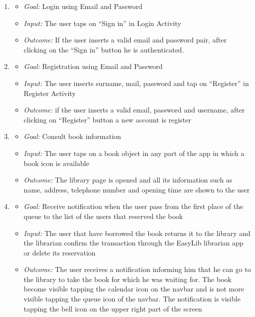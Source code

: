 \begin{enumerate}
	\item 
	\begin{itemize}
		\item \emph{Goal: }Login using Email and Password
		\item \emph{Input: }The user taps on “Sign in” in Login Activity
		\item \emph{Outcome: }If the user inserts a valid email and password
		pair, after clicking on the “Sign in” button he is
		authenticated.
		
	\end{itemize}

\item 
\begin{itemize}
	\item \emph{Goal: }Registration using Email and Password
	\item \emph{Input: }The user inserts surname, mail, password and tap on “Register” in Register Activity
	\item \emph{Outcome: }if the user inserts a valid email, password and username, after clicking on “Register” button a new
	account is register
\end{itemize}

\item 
\begin{itemize}
	\item \emph{Goal: }Consult book information
	\item \emph{Input: }The user taps on a book object in any part of the app in which a book icon is available
	\item \emph{Outcome: }The library page is opened and all its information such as name, address, telephone number and opening time are shown to the user
	
	
\end{itemize}

\item 
\begin{itemize}
	\item \emph{Goal: }Receive notification when the user pass from the first place of the queue to the list of the users that reserved the book
	\item \emph{Input: }The user that have borrowed the book returns it to the library and the librarian confirm the transaction through the EasyLib librarian app or delete its reservation
	\item \emph{Outcome: }The user receives a notification informing him that he can go to the library to take the book for which he was waiting for. The book become visible tapping the calendar icon on the navbar and is not more visible tapping the queue icon of the navbar. The notification is visible tapping the bell icon on the upper right part of the screen
\end{itemize}


\end{enumerate}
